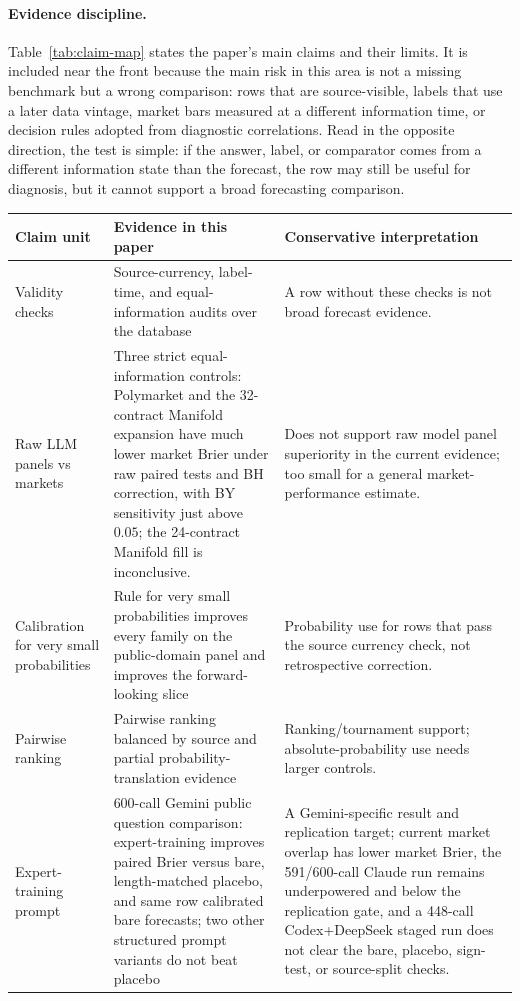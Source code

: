 \documentclass[11pt]{article}
\begin{document}
\paragraph{Evidence discipline.} Table~\ref{tab:claim-map} states the paper's main claims and their limits. It is included near the front because the main risk in this area is not a missing benchmark but a wrong comparison: rows that are source-visible, labels that use a later data vintage, market bars measured at a different information time, or decision rules adopted from diagnostic correlations. Read in the opposite direction, the test is simple: if the answer, label, or comparator comes from a different information state than the forecast, the row may still be useful for diagnosis, but it cannot support a broad forecasting comparison.

\begin{table}[htbp]
\centering
\small
\begin{tabular}{L{3.0cm} L{4.4cm} L{5.5cm}}
\toprule
Claim unit & Evidence in this paper & Conservative interpretation \\
\midrule
Validity checks & Source-currency, label-time, and equal-information audits over the database & A row without these checks is not broad forecast evidence. \\
Raw LLM panels vs markets & Three strict equal-information controls: Polymarket and the 32-contract Manifold expansion have much lower market Brier under raw paired tests and BH correction, with BY sensitivity just above \(0.05\); the 24-contract Manifold fill is inconclusive. & Does not support raw model panel superiority in the current evidence; too small for a general market-performance estimate. \\
Calibration for very small probabilities & Rule for very small probabilities improves every family on the public-domain panel and improves the forward-looking slice & Probability use for rows that pass the source currency check, not retrospective correction. \\
Pairwise ranking & Pairwise ranking balanced by source and partial probability-translation evidence & Ranking/tournament support; absolute-probability use needs larger controls. \\
Expert-training prompt & 600-call Gemini public question comparison: expert-training improves paired Brier versus bare, length-matched placebo, and same row calibrated bare forecasts; two other structured prompt variants do not beat placebo & A Gemini-specific result and replication target; current market overlap has lower market Brier, the 591/600-call Claude run remains underpowered and below the replication gate, and a 448-call Codex+DeepSeek staged run does not clear the bare, placebo, sign-test, or source-split checks. \\

\end{tabular}
\end{table}
\end{document}

